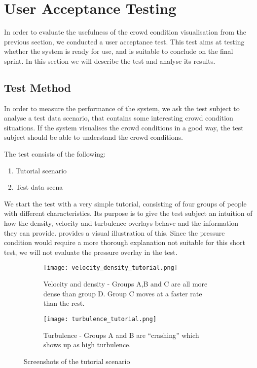 \section{User Acceptance Testing} \label{sec:s4_test}

In order to evaluate the usefulness of the crowd condition visualisation from the previous section, we conducted a user acceptance test. This test aims at testing whether the system is ready for use, and is suitable to conclude on the final sprint. In this section we will describe the test and analyse its results.

\subsection{Test Method}


In order to measure the performance of the system, we ask the test subject to analyse a test data scenario, that contains some interesting crowd condition situations. If the system visualises the crowd conditions in a good way, the test subject should be able to understand the crowd conditions.

The test consists of the following:

\begin{enumerate}
    \item Tutorial scenario
    \item Test data scena
\end{enumerate}

We start the test with a very simple tutorial, consisting of four groups of people with different characteristics. Its purpose is to give the test subject an intuition of how the density, velocity and turbulence overlays behave and the information they can provide.  provides a visual illustration of this. Since the pressure condition would require a more thorough explanation not suitable for this short test, we will not evaluate the pressure overlay in the test.

\begin{figure}[htbp]
\begin{subfigure}[t]{.49\linewidth}
    \centering
    \texttt{[image: velocity\_density\_tutorial.png]}
    \caption{Velocity and density - Groups A,B and C are all more dense than group D. Group C moves at a faster rate than the rest.}
\end{subfigure}
\enspace
\begin{subfigure}[t]{.49\linewidth}
    \centering
    \texttt{[image: turbulence\_tutorial.png]}
    \caption{Turbulence - Groups A and B are \enquote{crashing} which shows up as high turbulence.}
\end{subfigure}
\caption{Screenshots of the tutorial scenario}
\label{fig:tutorial_screens}
\end{figure}


